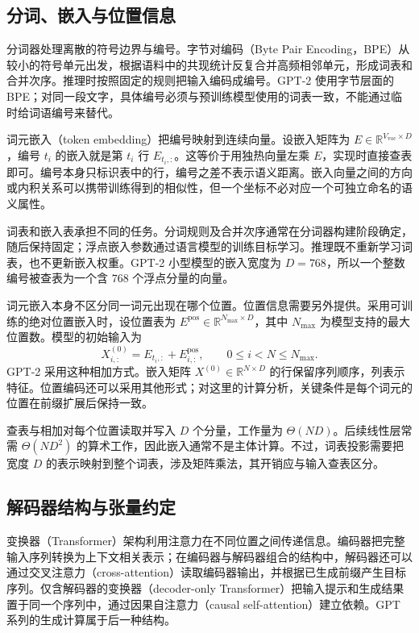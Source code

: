 \subsection{分词、嵌入与位置信息}

分词器处理离散的符号边界与编号。字节对编码（Byte Pair Encoding，BPE）从较小的符号单元出发，根据语料中的共现统计反复合并高频相邻单元，形成词表和合并次序。推理时按照固定的规则把输入编码成编号。GPT-2 使用字节层面的 BPE；对同一段文字，具体编号必须与预训练模型使用的词表一致，不能通过临时给词语编号来替代。

词元嵌入（token embedding）把编号映射到连续向量。设嵌入矩阵为 $E\in\mathbb{R}^{V_{\mathrm{voc}}\times D}$，编号 $t_i$ 的嵌入就是第 $t_i$ 行 $E_{t_i,:}$。这等价于用独热向量左乘 $E$，实现时直接查表即可。编号本身只标识表中的行，编号之差不表示语义距离。嵌入向量之间的方向或内积关系可以携带训练得到的相似性，但一个坐标不必对应一个可独立命名的语义属性。

词表和嵌入表承担不同的任务。分词规则及合并次序通常在分词器构建阶段确定，随后保持固定；浮点嵌入参数通过语言模型的训练目标学习。推理既不重新学习词表，也不更新嵌入权重。GPT-2 小型模型的嵌入宽度为 $D=768$，所以一个整数编号被查表为一个含 $768$ 个浮点分量的向量。

词元嵌入本身不区分同一词元出现在哪个位置。位置信息需要另外提供。采用可训练的绝对位置嵌入时，设位置表为 $E^{\mathrm{pos}}\in\mathbb{R}^{N_{\max}\times D}$，其中 $N_{\max}$ 为模型支持的最大位置数。模型的初始输入为
\begin{equation}
  X^{(0)}_{i,:}=E_{t_i,:}+E^{\mathrm{pos}}_{i,:},
  \qquad 0\leq i<N\leq N_{\max}.
  \label{l12:eq:embedding}
\end{equation}
GPT-2 采用这种相加方式。嵌入矩阵 $X^{(0)}\in\mathbb{R}^{N\times D}$ 的行保留序列顺序，列表示特征。位置编码还可以采用其他形式；对这里的计算分析，关键条件是每个词元的位置在前缀扩展后保持一致。

查表与相加对每个位置读取并写入 $D$ 个分量，工作量为 $\Theta(ND)$。后续线性层常需 $\Theta(ND^2)$ 的算术工作，因此嵌入通常不是主体计算。不过，词表投影需要把宽度 $D$ 的表示映射到整个词表，涉及矩阵乘法，其开销应与输入查表区分。

\subsection{解码器结构与张量约定}

变换器（Transformer）架构利用注意力在不同位置之间传递信息。编码器把完整输入序列转换为上下文相关表示；在编码器与解码器组合的结构中，解码器还可以通过交叉注意力（cross-attention）读取编码器输出，并根据已生成前缀产生目标序列。仅含解码器的变换器（decoder-only Transformer）把输入提示和生成结果置于同一个序列中，通过因果自注意力（causal self-attention）建立依赖。GPT 系列的生成计算属于后一种结构。

